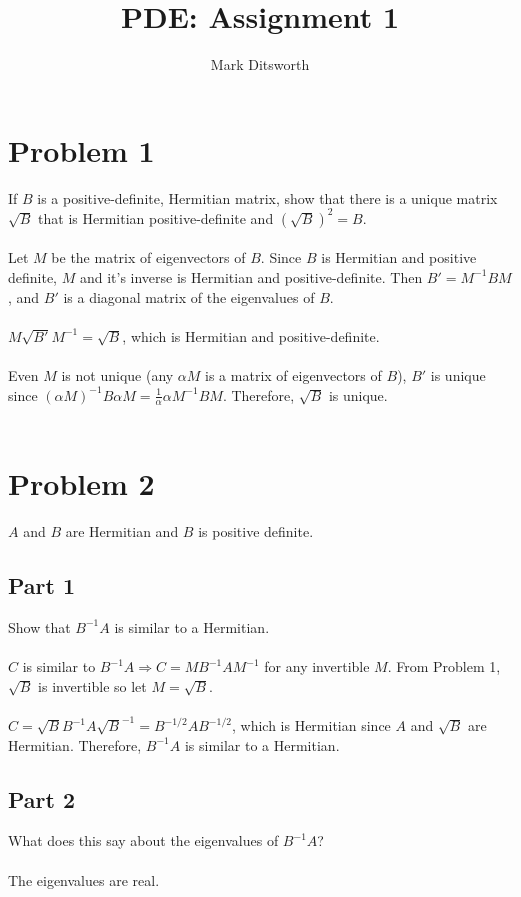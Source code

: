 \documentclass{amsart}
\title{PDE: Assignment 1}
\author{Mark Ditsworth}
\begin{document}
	\maketitle
	
	\section{Problem 1}
	If $B$ is a positive-definite, Hermitian matrix, show that there is a unique matrix $\sqrt{B}$ that is Hermitian positive-definite and $\left( \sqrt{B} \right) ^2 = B$.
	\\\\
	Let $M$ be the matrix of eigenvectors of $B$. Since $B$ is Hermitian and positive definite, $M$ and it's inverse is Hermitian and positive-definite. Then $B' = M^{-1}BM$, and $B'$ is a diagonal matrix of the eigenvalues of $B$.
	\\\\
	$M\sqrt{B'}M^{-1} = \sqrt{B}$, which is Hermitian and positive-definite.
	\\\\
	Even $M$ is not unique (any $\alpha M$ is a matrix of eigenvectors of $B$), $B'$ is unique since $(\alpha M)^{-1}B\alpha M = \frac{1}{\alpha}\alpha M^{-1}BM$. Therefore, $\sqrt{B}$ is unique.
	\\\\
	\section{Problem 2}
	$A$ and $B$ are Hermitian and $B$ is positive definite.
	\subsection{Part 1}
	Show that $B^{-1}A$ is similar to a Hermitian.
	\\\\
	$C$ is similar to $B^{-1}A \Rightarrow C=MB^{-1}AM^{-1}$ for any invertible $M$. From Problem 1, $\sqrt{B}$ is invertible so let $M=\sqrt{B}$.
	\\\\
	$C = \sqrt{B}B^{-1}A\sqrt{B}^{-1}=B^{-1/2}AB^{-1/2}$, which is Hermitian since $A$ and $\sqrt{B}$ are Hermitian. Therefore, $B^{-1}A$ is similar to a Hermitian.
	\subsection{Part 2}
	What does this say about the eigenvalues of $B^{-1}A$?
	\\\\
	The eigenvalues are real.
\end{document}
